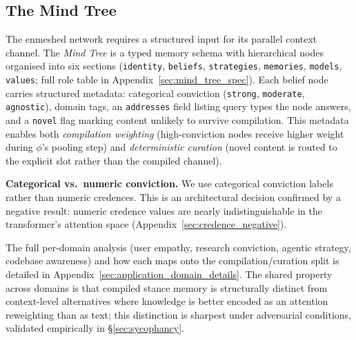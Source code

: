 \subsection{The Mind Tree}
\label{sec:mind_tree}

The enmeshed network requires a structured input for its parallel context channel. The \emph{Mind Tree} is a typed memory schema with hierarchical nodes organised into six sections (\texttt{identity}, \texttt{beliefs}, \texttt{strategies}, \texttt{memories}, \texttt{models}, \texttt{values}; full role table in Appendix~\ref{sec:mind_tree_spec}). Each belief node carries structured metadata: categorical conviction (\texttt{strong}, \texttt{moderate}, \texttt{agnostic}), domain tags, an \texttt{addresses} field listing query types the node answers, and a \texttt{novel} flag marking content unlikely to survive compilation. This metadata enables both \emph{compilation weighting} (high-conviction nodes receive higher weight during $\phi$'s pooling step) and \emph{deterministic curation} (novel content is routed to the explicit slot rather than the compiled channel).

\textbf{Categorical vs.\ numeric conviction.} We use categorical conviction labels rather than numeric credences. This is an architectural decision confirmed by a negative result: numeric credence values are nearly indistinguishable in the transformer's attention space (Appendix~\ref{sec:credence_negative}).

%

The full per-domain analysis (user empathy, research conviction, agentic strategy, codebase awareness) and how each maps onto the compilation/curation split is detailed in Appendix~\ref{sec:application_domain_details}. The shared property across domains is that compiled stance memory is structurally distinct from context-level alternatives where knowledge is better encoded as an attention reweighting than as text; this distinction is sharpest under adversarial conditions, validated empirically in \S\ref{sec:sycophancy}.

